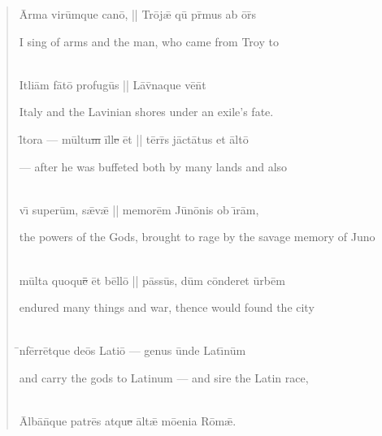 \documentclass[]{article}
\date{2009-01-26}
\begin{document}
\newcommand{\trans}[1]{
	\begin{normalsize}
		\begin{sc}
			{{#1}}
		\end{sc}
	\end{normalsize}
}
\begin{verse}
	\begin{metrica}
		\Large
	\={A}rm\-a v\-ir\=umqu\-e c\-an{\={\macron o}}, || Tr\={o}j\={\ae} qu\={\macron{\i}} pr\={\macron{\i}}m\-us \-ab \={o}r\={\macron{\i}}s\\

	\trans{I sing of arms and the man, who came from Troy to}\\
	
	{\macron I}tl\-i\={a}m f\={\macron a}t\={\macron o} pr\-of\-ug\={\macron u}s || L\={\macron a}v\={\macron{\i}}n\-aqu\-e v\={\macron e}n\={\macron{\i}}t\\

	\trans{Italy and the Lavinian shores under an exile's fate.}
	
	l\={\macron{\i}}t\-or\-a --- m\=ultu\sout{m }\={i}ll\={{\sout{e }}\=e}t || t\=err\={\macron{\i}}s j\=act\={\macron a}t\-us \-et \=alt\={\macron o}\\
	
	\trans{--- after he was buffeted both by many lands and also}\\
	
	v\={\i} s\-up\-er\=um, s\={\ae}v\={\ae} || m\-em\-or\=em J\={u}n\={o}n\-is \-ob \={\i}r\=am,\\
	
	\trans{the powers of the Gods, brought to rage by the savage memory of Juno}\\
	
	m\=ult\-a qu\-oqu\={\sout{\=e\= }\=e}t b\=ell\={o} || p\=ass\=us, d\=um c\=ond\-er\-et \=urb\=em\\
	
	\trans{endured many things and war, thence would found the city}\\
	
	\={\macron{\i}}nf\=err\=etqu\-e d\-e\={o}s L\-at\-i\={o} --- g\-en\-us \=und\-e L\-at\={\i}n\=um\\
	
	\trans{and carry the gods to Latinum --- and sire the Latin race,}\\
	
	\=Alb\={a}n\={\macron {\i}}qu\-e p\-atr\={e}s \-atqu\sout{e }\=alt\={\ae} m\={oe}n\-i\-a R\={\macron o}m\={\ae}.\\
	

\end{metrica}
\end{verse}
\end{document}

